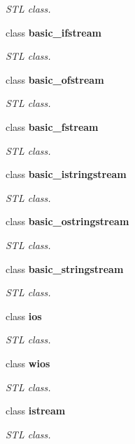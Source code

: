 \begin{DoxyCompactItemize}
\begin{DoxyCompactList}\small\item\em STL class. \end{DoxyCompactList}\item 
class {\bfseries basic\_\-ifstream}
\begin{DoxyCompactList}\small\item\em STL class. \end{DoxyCompactList}\item 
class {\bfseries basic\_\-ofstream}
\begin{DoxyCompactList}\small\item\em STL class. \end{DoxyCompactList}\item 
class {\bfseries basic\_\-fstream}
\begin{DoxyCompactList}\small\item\em STL class. \end{DoxyCompactList}\item 
class {\bfseries basic\_\-istringstream}
\begin{DoxyCompactList}\small\item\em STL class. \end{DoxyCompactList}\item 
class {\bfseries basic\_\-ostringstream}
\begin{DoxyCompactList}\small\item\em STL class. \end{DoxyCompactList}\item 
class {\bfseries basic\_\-stringstream}
\begin{DoxyCompactList}\small\item\em STL class. \end{DoxyCompactList}\item 
class {\bfseries ios}
\begin{DoxyCompactList}\small\item\em STL class. \end{DoxyCompactList}\item 
class {\bfseries wios}
\begin{DoxyCompactList}\small\item\em STL class. \end{DoxyCompactList}\item 
class {\bfseries istream}
\begin{DoxyCompactList}\small\item\em STL class. \end{DoxyCompactList}\item 

\end{DoxyCompactItemize}

